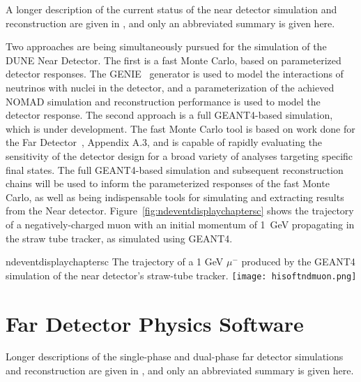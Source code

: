 A longer description of the current status of the near detector simulation and reconstruction are given
in \anxreco, and only an abbreviated summary is given here.

Two approaches are being simultaneously pursued for the simulation of the DUNE Near Detector.  The first is a fast Monte Carlo,
based on parameterized detector responses. The GENIE~\cite{GENIE} generator is used to model the interactions of neutrinos
with nuclei in the detector, and a parameterization of the achieved NOMAD simulation and reconstruction performance is used to
model the detector response.
The second approach is a full GEANT4-based simulation, which is under development.  The fast Monte Carlo tool is based on work done for
the Far Detector~\cite{Adams:2013qkq}, Appendix A.3, and is capable of rapidly evaluating the sensitivity of the detector
design for a broad variety of analyses targeting specific final states.   The full GEANT4-based simulation and subsequent reconstruction
chains will be used to inform the parameterized responses of the fast Monte Carlo, as well as being indispensable tools for simulating
and extracting results from the Near detector.  Figure~\ref{fig:ndeventdisplaychaptersc} shows the trajectory of a
negatively-charged muon with an initial momentum of 1~GeV propagating in the straw tube tracker, as simulated using GEANT4.

\begin{cdrfigure}{ndeventdisplaychaptersc}
{The trajectory of a 1 GeV $\mu^-$ produced by the GEANT4 simulation of the near detector's straw-tube tracker.}
\texttt{[image: hisoftndmuon.png]}
\end{cdrfigure}

\section{Far Detector Physics Software}
\label{sec:detectors-sc-physics-software}

Longer descriptions of the single-phase and dual-phase far detector simulations and reconstruction are given
in \anxreco, and only an abbreviated summary is given here.

%

